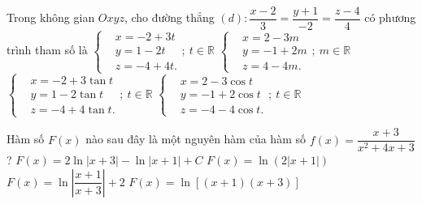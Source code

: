 \begin{ex}%
Trong không gian $Oxyz$, cho đường thẳng $\left(d\right)\colon \dfrac{x - 2}{3} = \dfrac{y + 1}{- 2} = \dfrac{z - 4}{4}$ có phương trình tham số là
	\choice
	{$
		\left\{\begin{aligned} 
		&x = - 2 + 3t\\ 
		&y =  1 - 2t\\
		&z = - 4 + 4t.
		\end{aligned}\right.;\ t\in\mathbb{R}
		$}
	{\True $
		\left\{\begin{aligned} 
		&x = 2 - 3m\\ 
		&y = - 1 + 2m\\
		&z = 4 - 4m.
		\end{aligned}\right.;\ m\in\mathbb{R}
		$}
	{$
		\left\{\begin{aligned} 
		&x = - 2 + 3\tan t\\ 
		&y =  1 - 2\tan t\\
		&z = - 4 + 4\tan t.
		\end{aligned}\right.;\ t\in\mathbb{R}
		$}
	{$
		\left\{\begin{aligned} 
		&x = 2 - 3\cos t\\ 
		&y =  - 1 + 2\cos t\\
		&z = - 4 - 4\cos t.
		\end{aligned}\right.;\ t\in\mathbb{R}
		$}
\end{ex}


\begin{ex}%
Hàm số $F\left(x\right)$ nào sau đây là một nguyên hàm của hàm số $f\left(x\right) = \dfrac{x + 3}{x^2 + 4x + 3}$?
	\choice
	{$F\left(x\right) = 2\ln\left\vert x + 3\right\vert - \ln\left\vert x + 1\right\vert + C$}
	{\True $F\left(x\right) = \ln\left(2\left\vert x + 1\right\vert\right)$}
	{$F\left(x\right) = \ln\left\vert\dfrac{ x + 1}{x + 3}\right\vert + 2$}
	{$F\left(x\right) = \ln\left[\left(x + 1\right)\left(x + 3\right)\right]$}
\end{ex}

